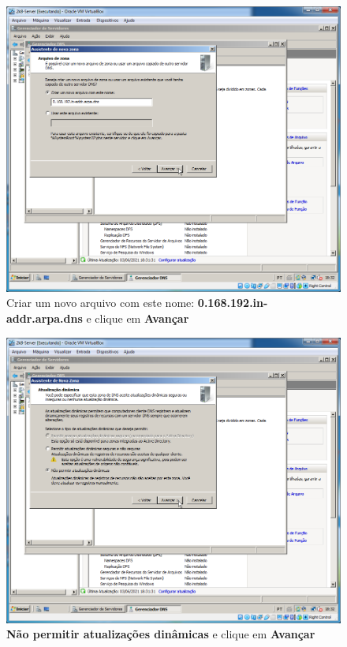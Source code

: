 \documentclass[10pt]{article}
\begin{document}
\begin{figure}[H]
    \centering
    \caption{Criar um novo arquivo com este nome: \textbf{0.168.192.in-addr.arpa.dns} e clique em \textbf{Avançar}}
    \label{fig:DNS025}
    \includegraphics[width=\linewidth]{images/windows_server/dns/025.png}
\end{figure}
\begin{figure}[H]
    \centering
    \caption{\textbf{Não permitir atualizações dinâmicas} e clique em \textbf{Avançar}}
    \label{fig:DNS026}
    \includegraphics[width=\linewidth]{images/windows_server/dns/026.png}
\end{figure}
\end{document}
